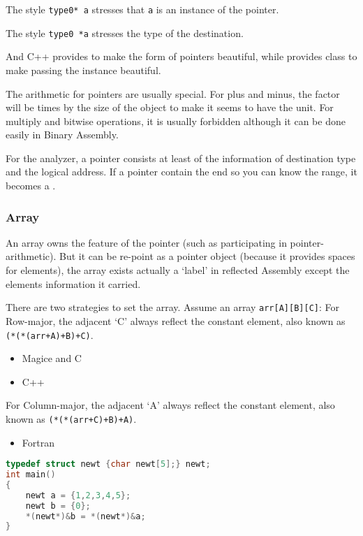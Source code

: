 The style \verb|type0* a| stresses that \verb|a| is an instance of the pointer.

The style \verb|type0 *a| stresses the type of the destination.

And C++ provides  to make the form of pointers beautiful, while provides class to make passing the instance beautiful.

The arithmetic for pointers are usually special. For plus and minus, the factor will be times by the size of the object to make it seems to have the unit. For multiply and bitwise operations, it is usually forbidden although it can be done easily in Binary Assembly. 

For the analyzer, a pointer consists at least of the information of destination type and the logical address.
If a pointer contain the end so you can know the range, it becomes a .

\subsubsection{Array}

An array owns the feature of the pointer (such as participating in pointer-arithmetic). But it can be re-point as a pointer object (because it provides spaces for elements), the array exists actually a `label' in reflected Assembly except the elements information it carried. 

There are two strategies to set the array. Assume an array \verb|arr[A][B][C]|:
For Row-major, the adjacent `C' always reflect the constant element, also known as \verb|(*(*(arr+A)+B)+C)|.
\begin{itemize}
	\item Magice and C
	\item C++
\end{itemize}
For Column-major, the adjacent `A' always reflect the constant element, also known as \verb|(*(*(arr+C)+B)+A)|.
\begin{itemize}
	\item Fortran
\end{itemize}

\begin{lstlisting}[language=C]
typedef struct newt {char newt[5];} newt;
int main()
{
	newt a = {1,2,3,4,5};
	newt b = {0};
	*(newt*)&b = *(newt*)&a;
}
\end{lstlisting}

